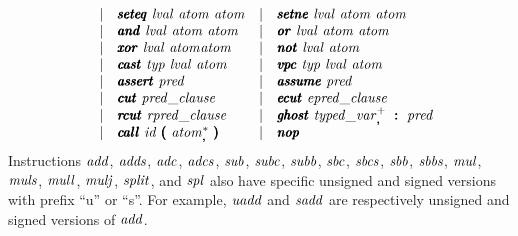 \documentclass{article}
\begin{document}
\[\begin{array}{rclcl}
         & \mid & \pmb{\mathit{seteq}}\ \mathit{lval}\ \mathit{atom}\ \mathit{atom}
         & \mid & \pmb{\mathit{setne}}\ \mathit{lval}\ \mathit{atom}\ \mathit{atom} \\
         & \mid & \pmb{\mathit{and}}\ \mathit{lval}\ \mathit{atom}\ \mathit{atom}
         & \mid & \pmb{\mathit{or}}\ \mathit{lval}\ \mathit{atom}\ \mathit{atom} \\
         & \mid & \pmb{\mathit{xor}}\ \mathit{lval}\ \mathit{atom} \mathit{atom}
         & \mid & \pmb{\mathit{not}}\ \mathit{lval}\ \mathit{atom} \\
         & \mid & \pmb{\mathit{cast}}\ \mathit{typ}\ \mathit{lval}\ \mathit{atom}
         & \mid & \pmb{\mathit{vpc}}\ \mathit{typ}\ \mathit{lval}\ \mathit{atom} \\
         & \mid & \pmb{\mathit{assert}}\ \mathit{pred}
         & \mid & \pmb{\mathit{assume}}\ \mathit{pred} \\
         & \mid & \pmb{\mathit{cut}}\ \mathit{pred\_clause}
         & \mid & \pmb{\mathit{ecut}}\ \mathit{epred\_clause} \\
         & \mid & \pmb{\mathit{rcut}}\ \mathit{rpred\_clause}
         & \mid & \pmb{\mathit{ghost}}\ \mathit{typed\_var}_{\pmb,}^+\ \pmb{:}\ \mathit{pred} \\
         & \mid & \pmb{\mathit{call}}\ \mathit{id}\ \pmb{(}\ \mathit{atom}_{\pmb,}^*\
           \pmb{)}
  & \mid & \pmb{\mathit{nop}}
\end{array}
\]
Instructions $\mathit{add}$, $\mathit{adds}$, $\mathit{adc}$, $\mathit{adcs}$, $\mathit{sub}$, $\mathit{subc}$,
$\mathit{subb}$, $\mathit{sbc}$, $\mathit{sbcs}$, $\mathit{sbb}$, $\mathit{sbbs}$, $\mathit{mul}$, $\mathit{muls}$,
$\mathit{mull}$, $\mathit{mulj}$, $\mathit{split}$, and $\mathit{spl}$ also have specific unsigned
and signed versions with prefix ``u'' or ``s''.
For example, $\mathit{uadd}$ and $\mathit{sadd}$ are respectively unsigned and
signed versions of $\mathit{add}$.
\end{document}
